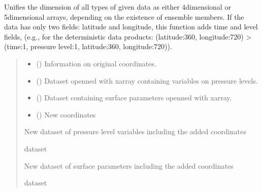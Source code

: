 \documentclass[a4paper,11pt,english]{sphinxmanual}
\begin{document}
\begin{fulllineitems}
\label{\detokenize{modules:climaccf.extend_dim.extend_dimensions}}
\pysigstartsignatures
{}
\pysigstopsignatures
\sphinxAtStartPar
Unifies the dimension of all types of given data as either 4\sphinxhyphen{}dimensional or 5\sphinxhyphen{}dimensional arrays, depending on
the existence of ensemble members. If the data has only two fields: latitude and longitude, this function
adds time and level fields, (e.g., for the deterministic data products: (latitude:360, longitude:720) \sphinxhyphen{}\textgreater{} (time:1, pressure level:1, latitude:360, longitude:720)).
\begin{quote}\begin{description}
\begin{itemize}
\item {} 
\sphinxAtStartPar
{} () \textendash{} Information on original coordinates.

\item {} 
\sphinxAtStartPar
{} () \textendash{} Dataset openned with xarray containing variables on pressure levels.

\item {} 
\sphinxAtStartPar
{} () \textendash{} Dataset containing surface parameters openned with xarray.

\item {} 
\sphinxAtStartPar
{} () \textendash{} New coordinates

\end{itemize}

\sphinxAtStartPar
New dataset of pressure level variables including the added coordinates

\sphinxAtStartPar
dataset

\sphinxAtStartPar
New dataset of surface parameters including the added coordinates

\sphinxAtStartPar
dataset

\end{description}\end{quote}

\end{fulllineitems}
\end{document}
